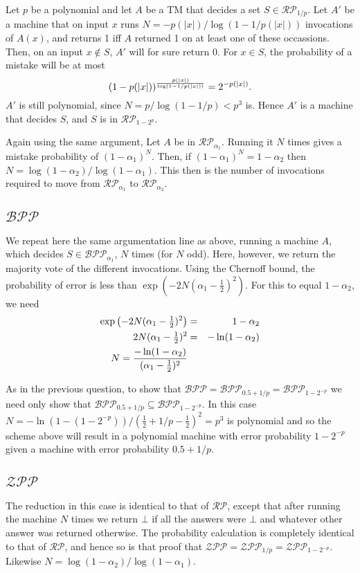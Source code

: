 \documentclass[11pt]{article} \usepackage{amssymb}
\newcommand{\half}{{\textstyle \frac12}}
\begin{document}
Let $p$ be a polynomial and let $A$ be a TM that decides a set 
$S\in\mathcal{RP}_{1/p}$. Let $A'$ be a 
machine that on input $x$ runs $N=-p(|x|)/\log(1-1/p(|x|))$ invocations of
$A(x)$, 
and returns 1 iff $A$ returned 1
on at least one of these occassions. Then, on an input $x\not\in S$, $A'$ will
for sure return 0. For $x\in S$, the probability of a mistake will be
at most 
\begin{equation*}
  (1-p(|x|))^{p(|x|) \over \log(1-1/p(|x|))} = 2^{-p(|x|)}.
\end{equation*}
$A'$ is still polynomial, since $N=p/\log(1-1/p)<p^3$ 
is. Hence $A'$ is a machine that decides
$S$, and $S$ is in $\mathcal{RP}_{1-2^p}$.


Again using the same argument, Let $A$ be in 
$\mathcal{RP}_{\alpha_1}$. Running it $N$ times gives a mistake 
probability of $(1-\alpha_1)^N$. Then, if $(1-\alpha_1)^N=1-\alpha_2$ then 
$N=\log(1-\alpha_2)/\log(1-\alpha_1)$. This then is the number of invocations
required to move from $\mathcal{RP}_{\alpha_1}$ to $\mathcal{RP}_{\alpha_2}$.

\subsection{$\mathcal{BPP}$}
We repeat here the same argumentation line as above, running a machine 
$A$, which decides $S\in\mathcal{BPP}_{\alpha_1}$,
$N$ times (for $N$ odd). Here, however, we return the majority vote of the
different invocations. Using the Chernoff bound, the probability of error
is less than $\exp\left(-2N(\alpha_1-\half)^2\right)$. For this to equal $1-\alpha_2$, we need
\begin{eqnarray*}
  \exp\left(-2N(\alpha_1-\half)^2\right) &=& 1-\alpha_2
\\ 2N(\alpha_1-\half)^2 &=& -\ln(1-\alpha_2)
\\ N = {-\ln(1-\alpha_2) \over (\alpha_1-\half)^2}
\end{eqnarray*}

As in the previous question, to show that 
$\mathcal{BPP}=\mathcal{BPP}_{0.5+1/p}=\mathcal{BPP}_{1-2^{-p}}$ we need only
show that $\mathcal{BPP}_{0.5+1/p} \subseteq \mathcal{BPP}_{1-2^{-p}}$. In
this case $N=-\ln(1-(1-2^{-p}))/(\half+1/p-\half)^2=p^3$ is polynomial and so the scheme
above will result in a polynomial machine with error probability $1-2^{-p}$
given a machine with error probability $0.5+1/p$.

\subsection{$\mathcal{ZPP}$}

The reduction in this case is identical to that of 
$\mathcal{RP}$, except that after running the machine $N$ times we return
$\bot$ if all the answers were $\bot$ and whatever other answer was
returned otherwise. The probability calculation is completely identical to that
of $\mathcal{RP}$, and hence so is that proof that 
$\mathcal{ZPP}=\mathcal{ZPP}_{1/p}=\mathcal{ZPP}_{1-2^{-p}}$. Likewise $N=\log(1-\alpha_2)/\log(1-\alpha_1)$.
\end{document}
